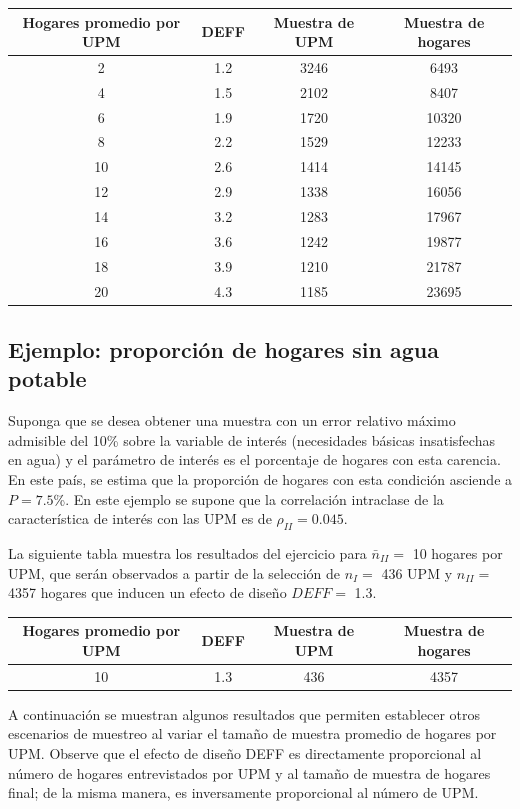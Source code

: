 \documentclass[
  12pt,
  spanish,
]{book}
\begin{document}
\begin{longtable}[]{@{}cccc@{}}
\toprule
Hogares promedio por UPM & DEFF & Muestra de UPM & Muestra de hogares \\
\midrule
\endhead
2 & 1.2 & 3246 & 6493 \\
4 & 1.5 & 2102 & 8407 \\
6 & 1.9 & 1720 & 10320 \\
8 & 2.2 & 1529 & 12233 \\
10 & 2.6 & 1414 & 14145 \\
12 & 2.9 & 1338 & 16056 \\
14 & 3.2 & 1283 & 17967 \\
16 & 3.6 & 1242 & 19877 \\
18 & 3.9 & 1210 & 21787 \\
20 & 4.3 & 1185 & 23695 \\
\bottomrule
\end{longtable}

\hypertarget{ejemplo-proporciuxf3n-de-hogares-sin-agua-potable}{%
\subsection{Ejemplo: proporción de hogares sin agua potable}\label{ejemplo-proporciuxf3n-de-hogares-sin-agua-potable}}

Suponga que se desea obtener una muestra con un error relativo máximo admisible del 10\% sobre la variable de interés (necesidades básicas insatisfechas en agua) y el parámetro de interés es el porcentaje de hogares con esta carencia. En este país, se estima que la proporción de hogares con esta condición asciende a \(P = 7.5\)\%. En este ejemplo se supone que la correlación intraclase de la característica de interés con las UPM es de \(\rho_{II} = 0.045\).

La siguiente tabla muestra los resultados del ejercicio para \(\bar{n}_{II} =\) 10 hogares por UPM, que serán observados a partir de la selección de \(n_{I} =\) 436 UPM y \(n_{II} =\) 4357 hogares que inducen un efecto de diseño \(DEFF =\) 1.3.

\begin{longtable}[]{@{}cccc@{}}
\toprule
Hogares promedio por UPM & DEFF & Muestra de UPM & Muestra de hogares \\
\midrule
\endhead
10 & 1.3 & 436 & 4357 \\
\bottomrule
\end{longtable}

A continuación se muestran algunos resultados que permiten establecer otros escenarios de muestreo al variar el tamaño de muestra promedio de hogares por UPM. Observe que el efecto de diseño DEFF es directamente proporcional al número de hogares entrevistados por UPM y al tamaño de muestra de hogares final; de la misma manera, es inversamente proporcional al número de UPM.
\end{document}

